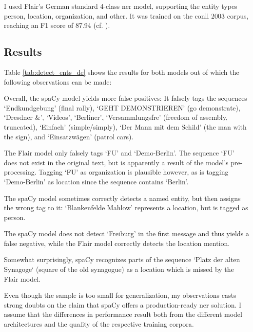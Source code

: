 I used Flair's German standard 4-class \gls{ner} model, supporting the entity types person, location, organization, and other. It was trained on the \gls{conll} 2003 corpus, reaching an F1 score of 87.94 (cf. \cite{flair_ner_german_standard_model}).                

\subsection{Results}

Table \ref{tab:detect_ents_de} shows the results for both models out of which the following observations can be made: 

Overall, the spaCy model yields more false positives: It falsely tags the sequences `Endkundgebung' (final rally), `GEHT DEMONSTRIEREN' (go demonstrate), `Dresdner \&', `Videos', `Berliner', `Versammlungsfre' (freedom of assembly, truncated), `Einfach' (simple/simply), `Der Mann mit dem Schild' (the man with the sign), and `Einsatzwägen' (patrol cars). 

The Flair model only falsely tags `FU' and `Demo-Berlin'. The sequence `FU' does not exist in the original text, but is apparently a result of the model's pre-processing. Tagging `FU' as organization is plausible however, as is tagging `Demo-Berlin' as location since the sequence contains `Berlin'. 

The spaCy model sometimes correctly detects a named entity, but then assigns the wrong tag to it: `Blankenfelde Mahlow' represents a location, but is tagged as person. 

The spaCy model does not detect `Freiburg' in the first message and thus yields a false negative, while the Flair model correctly detects the location mention. 

Somewhat surprisingly, spaCy recognizes parts of the sequence `Platz der alten Synagoge` (square of the old synagogue) as a location which is missed by the Flair model. 

Even though the sample is too small for generalization, my observations casts strong doubts on the claim that spaCy offers a production-ready \gls{ner} solution. I assume that the differences in performance result both from the different model architectures and the quality of the respective training corpora. 

